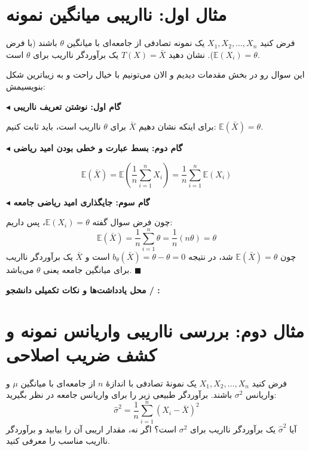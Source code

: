 \documentclass[12pt,a4paper,oneside]{report}
\newcommand{\step}[1]{\par\smallskip\noindent\textbf{\color{stepcolor}$\blacktriangleleft$ #1}\par\smallskip}
\newcommand{\notespace}{%
  \par\vspace{8pt}%
  \begin{tcolorbox}[breakable=false,colback=white,colframe=muted!50,boxrule=.6pt,arc=1.5mm,height=0.36\textheight]
    \textcolor{muted!70}{\small\textbf{محل یادداشت‌ها و نکات تکمیلی دانشجو / \lr{TA}:}}
  \end{tcolorbox}%
  \par\vspace{8pt}%
}
\newcommand{\E}{\mathbb E}
\begin{document}
\section*{مثال اول: نااریبی میانگین نمونه}

\begin{question}
فرض کنید $X_1, X_2, \dots, X_n$ یک نمونه تصادفی از جامعه‌ای با میانگین $\theta$ باشند (با فرض $\E(X_i) = \theta$). نشان دهید $T(X) = \bar{X}$ یک برآوردگر نااریب برای $\theta$ است.
\end{question}

\begin{solutionbox}
این سوال رو در بخش مقدمات دیدیم و الان می‌تونیم با خیال راحت و به زیباترین شکل بنویسیمش:

\step{گام اول: نوشتن تعریف نااریبی}
برای اینکه نشان دهیم $\bar{X}$ برای $\theta$ نااریب است، باید ثابت کنیم: $\E(\bar{X}) = \theta$.

\step{گام دوم: بسط عبارت و خطی بودن امید ریاضی}
\[
\E(\bar{X}) = \E\!\left(\frac{1}{n} \sum_{i=1}^n X_i\right) = \frac{1}{n} \sum_{i=1}^n \E(X_i)
\]

\step{گام سوم: جایگذاری امید ریاضی جامعه}
چون فرض سوال گفته $\E(X_i) = \theta$، پس داریم:
\[
\E(\bar{X}) = \frac{1}{n} \sum_{i=1}^n \theta = \frac{1}{n} (n\theta) = \theta
\]
چون $\E(\bar{X}) = \theta$ شد، در نتیجه $b_\theta(\bar{X}) = \theta - \theta = 0$ است و $\bar{X}$ یک برآوردگر نااریب برای میانگین جامعه یعنی $\theta$ می‌باشد. $\blacksquare$
\end{solutionbox}

\notespace

\clearpage
\section*{مثال دوم: بررسی نااریبی واریانس نمونه و کشف ضریب اصلاحی}

\begin{question}
فرض کنید $X_1, X_2, \dots, X_n$ یک نمونهٔ تصادفی با اندازهٔ $n$ از جامعه‌ای با میانگین $\mu$ و واریانس $\sigma^2$ باشند. برآوردگر طبیعی زیر را برای واریانس جامعه در نظر بگیرید:
\[
\hat{\sigma}^2 = \frac{1}{n} \sum_{i=1}^n (X_i - \bar{X})^2
\]
آیا $\hat{\sigma}^2$ یک برآوردگر نااریب برای $\sigma^2$ است؟ اگر نه، مقدار اریبی آن را بیابید و برآوردگر نااریب مناسب را معرفی کنید.
\end{question}
\end{document}
